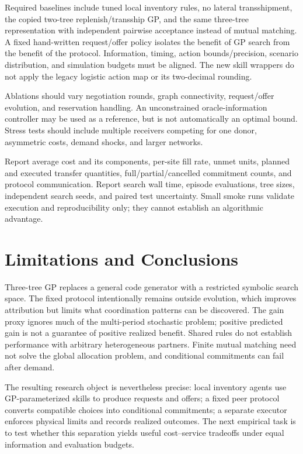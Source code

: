 \documentclass[journal]{IEEEtran}
\begin{document}
Required baselines include tuned local inventory rules, no lateral
transshipment, the copied two-tree replenish/transship GP, and the same
three-tree representation with independent pairwise acceptance instead of
mutual matching. A fixed hand-written request/offer policy isolates the
benefit of GP search from the benefit of the protocol. Information, timing,
action bounds/precision, scenario distribution, and simulation budgets must
be aligned. The new skill wrappers do not apply the legacy logistic action
map or its two-decimal rounding.

Ablations should vary negotiation rounds, graph connectivity, request/offer
evolution, and reservation handling. An unconstrained oracle-information
controller may be used as a reference, but is not automatically an optimal
bound. Stress tests should include multiple receivers competing for one
donor, asymmetric costs, demand shocks, and larger networks.

Report average cost and its components, per-site fill rate, unmet units,
planned and executed transfer quantities, full/partial/cancelled commitment
counts, and protocol communication. Report search wall time, episode
evaluations, tree sizes, independent search seeds, and paired test uncertainty.
Small smoke runs validate execution and reproducibility only; they cannot
establish an algorithmic advantage.

\section{Limitations and Conclusions}
Three-tree GP replaces a general code generator with a restricted symbolic
search space. The fixed protocol intentionally remains outside evolution,
which improves attribution but limits what coordination patterns can be
discovered. The gain proxy ignores much of the multi-period stochastic
problem; positive predicted gain is not a guarantee of positive realized
benefit. Shared rules do not establish performance with arbitrary
heterogeneous partners. Finite mutual matching need not solve the global
allocation problem, and conditional commitments can fail after demand.

The resulting research object is nevertheless precise: local inventory
agents use GP-parameterized skills to produce requests and offers; a fixed
peer protocol converts compatible choices into conditional commitments; a
separate executor enforces physical limits and records realized outcomes.
The next empirical task is to test whether this separation yields useful
cost--service tradeoffs under equal information and evaluation budgets.



\end{document}
